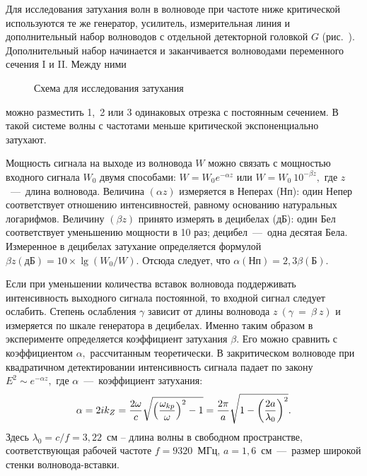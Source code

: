 
Для исследования затухания волн в волноводе при частоте ниже критической
используются те же генератор, усилитель, измерительная линия и дополнительный
набор волноводов с отдельной детекторной головкой $G$ (рис.~). Дополнительный набор начинается и заканчивается волноводами
переменного сечения I и II. Между ними

\begin{figure}[h!]
    \caption{Схема для исследования затухания} 
\end{figure}

можно разместить 1,~2 или 3 одинаковых отрезка с постоянным сечением. В такой
системе волны с частотами меньше критической экспоненциально затухают.

Мощность сигнала на выходе из волновода $W$ можно связать с мощностью входного
сигнала $W_0$ двумя способами: $W=W_0e^{-\alpha z}$ или $W=W_0~10^{-\beta z},$
где $z$~---~длина волновода. Величина $(\alpha z)$ измеряется в Неперах (Нп):
один Непер соответствует отношению интенсивностей, равному основанию натуральных
логарифмов. Величину $(\beta z)$ принято измерять в децибелах (дБ): один Бел
соответствует уменьшению мощности в 10 раз; децибел~---~одна десятая Бела.
Измеренное в децибелах затухание определяется формулой $\beta
z(\text{дБ})=10\times\lg(W_0/W).$ Отсюда следует, что
$\alpha(\text{Нп})=2,3\beta(\text{Б}).$

Если при уменьшении количества вставок волновода поддерживать интенсивность
выходного сигнала постоянной, то входной сигнал следует ослабить. Степень
ослабления $\gamma$ зависит от длины волновода $z~(\gamma~=~\beta~z)$ и
измеряется по шкале генератора в децибелах. Именно таким образом в эксперименте
определяется коэффициент затухания $\beta.$ Его можно сравнить с коэффициентом
$\alpha,$ рассчитанным теоретически. В закритическом волноводе при квадратичном
детектировании интенсивность сигнала падает по закону $E^2\sim e^{-\alpha z},$
где $\alpha$~---~коэффициент затухания: 
\begin{equation} \eqmark{2.0.7}
\alpha=2ik_{Z}=\dfrac{2\omega}{c}\sqrt{\left(\dfrac{\omega_{kp}}{\omega}\right)^2-1}=
\dfrac{2\pi}{a}\sqrt{1-\left(\dfrac{2a}{\lambda_0}\right)^2}. 
\end{equation} 
Здесь $\lambda_0=c/f=3,22$~см – длина волны в свободном пространстве, 
соответствующая рабочей частоте $f=9320$~МГц, $a=1,6$~см~---~размер широкой 
стенки волновода-вставки.


